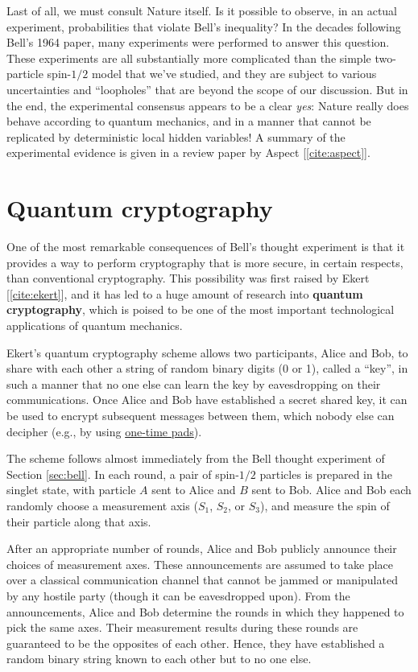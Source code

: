 \documentclass[pra,12pt]{revtex4}
\begin{document}
Last of all, we must consult Nature itself.  Is it possible to
observe, in an actual experiment, probabilities that violate Bell's
inequality?  In the decades following Bell's 1964 paper, many
experiments were performed to answer this question.  These experiments
are all substantially more complicated than the simple two-particle
spin-$1/2$ model that we've studied, and they are subject to various
uncertainties and ``loopholes'' that are beyond the scope of our
discussion.  But in the end, the experimental consensus appears to be
a clear \textit{yes}: Nature really does behave according to quantum
mechanics, and in a manner that cannot be replicated by deterministic
local hidden variables!  A summary of the experimental evidence is
given in a review paper by Aspect [\ref{cite:aspect}].

\section{Quantum cryptography}

One of the most remarkable consequences of Bell's thought experiment
is that it provides a way to perform cryptography that is more secure,
in certain respects, than conventional cryptography.  This possibility
was first raised by Ekert [\ref{cite:ekert}], and it has led to a huge
amount of research into \textbf{quantum cryptography}, which is poised
to be one of the most important technological applications of quantum
mechanics.

Ekert's quantum cryptography scheme allows two participants, Alice and
Bob, to share with each other a string of random binary digits (0 or
1), called a ``key'', in such a manner that no one else can learn the
key by eavesdropping on their communications.  Once Alice and Bob have
established a secret shared key, it can be used to encrypt subsequent
messages between them, which nobody else can decipher (e.g., by using
\href{https://en.wikipedia.org/wiki/One-time_pad}{one-time pads}).

The scheme follows almost immediately from the Bell thought experiment
of Section \ref{sec:bell}.  In each round, a pair of spin-$1/2$
particles is prepared in the singlet state, with particle $A$ sent to
Alice and $B$ sent to Bob.  Alice and Bob each randomly choose a
measurement axis ($S_1$, $S_2$, or $S_3$), and measure the spin of
their particle along that axis.

After an appropriate number of rounds, Alice and Bob publicly announce
their choices of measurement axes.  These announcements are assumed to
take place over a classical communication channel that cannot be
jammed or manipulated by any hostile party (though it can be
eavesdropped upon).  From the announcements, Alice and Bob determine
the rounds in which they happened to pick the same axes.  Their
measurement results during these rounds are guaranteed to be the
opposites of each other.  Hence, they have established a random binary
string known to each other but to no one else.
\end{document}
